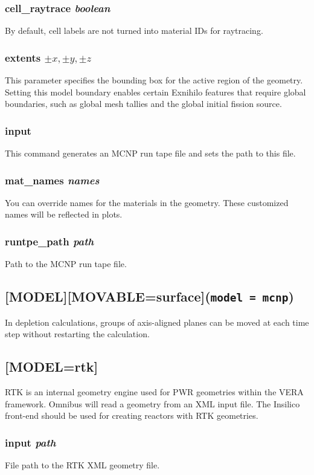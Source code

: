 \documentclass[10pt]{article}
\begin{document}
\subsubsection{cell\_raytrace \textit{boolean}}
By default, cell labels are not turned into material IDs for raytracing.

\subsubsection{extents \textit{\(\pm x, \pm y, \pm z\)}}
This parameter specifies the bounding box for the active region of the geometry. Setting this model boundary enables certain Exnihilo features that require global boundaries, such as global mesh tallies and the global initial fission source.

\subsubsection{input}
This command generates an MCNP run tape file and sets the path to this file.

\subsubsection{mat\_names \textit{names}}
You can override names for the materials in the geometry. These customized names will be reflected in plots.

\subsubsection{runtpe\_path \textit{path}}
Path to the MCNP run tape file.

\subsection{[MODEL][MOVABLE=surface]\quad\quad\quad(\texttt{model = mcnp})}
In depletion calculations, groups of axis-aligned planes can be moved at each time step without restarting the calculation.

\subsection{[MODEL=rtk]}
RTK is an internal geometry engine used for PWR geometries within the VERA framework. Omnibus will read a geometry from an XML input file. The Insilico front-end should be used for creating reactors with RTK geometries.

\subsubsection{input \textit{path}}
File path to the RTK XML geometry file.
\end{document}
